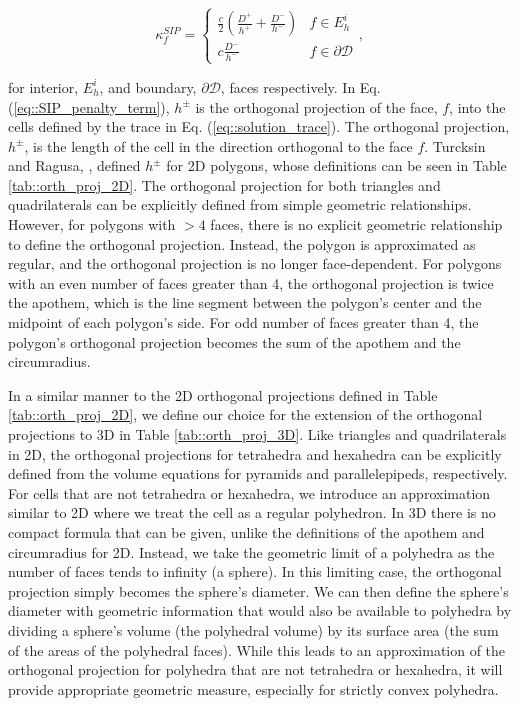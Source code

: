 \begin{equation}
\kappa_f^{SIP} = 
\begin{cases}
	\frac{c}{2} \left(  \frac{D^+}{h^+} + \frac{D^-}{h^-} \right) & f \in E_h^i\\ 
	c \frac{D^-}{h^-}& f \in \partial \mathcal{D}
\end{cases},
\label{eq::SIP_penalty_term}
\end{equation}

\noindent for interior, $E_h^i$, and boundary, $\partial \mathcal{D}$, faces respectively. In Eq. (\ref{eq::SIP_penalty_term}), $h^\pm$ is the orthogonal projection of the face, $f$, into the cells defined by the trace in Eq. (\ref{eq::solution_trace}). The orthogonal projection, $h^\pm$, is the length of the cell in the direction orthogonal to the face $f$. Turcksin and Ragusa, \cite{turcksin2014discontinuous}, defined $h^\pm$ for 2D polygons, whose definitions can be seen in Table \ref{tab::orth_proj_2D}. The orthogonal projection for both triangles and quadrilaterals can be explicitly defined from simple geometric relationships. However, for polygons with $>4$ faces, there is no explicit geometric relationship to define the orthogonal projection. Instead, the polygon is approximated as regular, and the orthogonal projection is no longer face-dependent. For polygons with an even number of faces greater than 4, the orthogonal projection is twice the apothem, which is the line segment between the polygon's center and the midpoint of each polygon's side. For odd number of faces greater than 4, the polygon's orthogonal projection becomes the sum of the apothem and the circumradius.

 In a similar manner to the 2D orthogonal projections defined in Table \ref{tab::orth_proj_2D}, we define our choice for the extension of the orthogonal projections to 3D in Table \ref{tab::orth_proj_3D}. Like triangles and quadrilaterals in 2D, the orthogonal projections for tetrahedra and hexahedra can be explicitly defined from the volume equations for pyramids and parallelepipeds, respectively. For cells that are not tetrahedra or hexahedra, we introduce an approximation similar to 2D where we treat the cell as a regular polyhedron. In 3D there is no compact formula that can be given, unlike the definitions of the apothem and circumradius for 2D. Instead, we take the geometric limit of a polyhedra as the number of faces tends to infinity (a sphere). In this limiting case, the orthogonal projection simply becomes the sphere's diameter. We can then define the sphere's diameter with geometric information that would also be available to polyhedra by dividing a sphere's volume (the polyhedral volume) by its surface area (the sum of the areas of the polyhedral faces). While this leads to an approximation of the orthogonal projection for polyhedra that are not tetrahedra or hexahedra, it will provide appropriate geometric measure, especially for strictly convex polyhedra.

